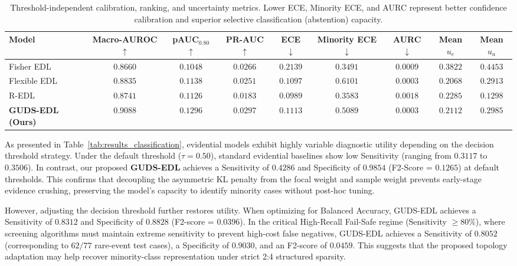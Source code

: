 \documentclass[letterpaper]{article} %
\begin{document}
\begin{table}[!t]
\centering
\caption{Threshold-independent calibration, ranking, and uncertainty metrics. Lower ECE, Minority ECE, and AURC represent better confidence calibration and superior selective classification (abstention) capacity.}
\label{tab:results_uncertainty}
\renewcommand{\arraystretch}{1.12}
\setlength{\tabcolsep}{3.0pt}
\begin{adjustbox}{max width=\textwidth}
\begin{tabular}{l C C C C C C C C}
\toprule
\textbf{Model} & \textbf{Macro-AUROC} $\uparrow$ & \textbf{pAUC$_{0.80}$} $\uparrow$ & \textbf{PR-AUC} $\uparrow$ & \textbf{ECE} $\downarrow$ & \textbf{Minority ECE} $\downarrow$ & \textbf{AURC} $\downarrow$ & \textbf{Mean $u_e$} & \textbf{Mean $u_a$} \\
\midrule
Fisher EDL   & $0.8660$ & $0.1048$ & $0.0266$ & $0.2139$ & $\mathbf{0.3491}$ & $0.0009$ & $0.3822$ & $0.4453$ \\
Flexible EDL & $0.8835$ & $0.1138$ & $0.0251$ & $0.1097$ & $0.6101$ & $\mathbf{0.0003}$ & $0.2068$ & $0.2913$ \\
R-EDL        & $0.8741$ & $0.1126$ & $0.0183$ & $\mathbf{0.0989}$ & $0.3583$ & $0.0018$ & $0.2285$ & $\mathbf{0.1298}$ \\
\midrule
\textbf{GUDS-EDL (Ours)} & $\mathbf{0.9088}$ & $\mathbf{0.1296}$ & $\mathbf{0.0297}$ & $0.1113$ & $0.5089$ & $\mathbf{0.0003}$ & $0.2112$ & $0.2985$ \\
\bottomrule
\end{tabular}
\end{adjustbox}
\end{table}

As presented in Table~\ref{tab:results_classification}, evidential models exhibit highly variable diagnostic utility depending on the decision threshold strategy. Under the default threshold ($\tau = 0.50$), standard evidential baselines show low Sensitivity (ranging from $0.3117$ to $0.3506$). In contrast, our proposed \textbf{GUDS-EDL} achieves a Sensitivity of $\mathbf{0.4286}$ and Specificity of $\mathbf{0.9854}$ (F2-Score = $\mathbf{0.1265}$) at default thresholds. This confirms that decoupling the asymmetric KL penalty from the focal weight and sample weight prevents early-stage evidence crushing, preserving the model's capacity to identify minority cases without post-hoc tuning.

However, adjusting the decision threshold further restores utility. When optimizing for Balanced Accuracy, GUDS-EDL achieves a Sensitivity of $\mathbf{0.8312}$ and Specificity of $\mathbf{0.8828}$ (F2-score = $\mathbf{0.0396}$). In the critical High-Recall Fail-Safe regime (Sensitivity $\ge 80\%$), where screening algorithms must maintain extreme sensitivity to prevent high-cost false negatives, GUDS-EDL achieves a Sensitivity of $0.8052$ (corresponding to $62/77$ rare-event test cases), a Specificity of $\mathbf{0.9030}$, and an F2-score of $\mathbf{0.0459}$. This suggests that the proposed topology adaptation may help recover minority-class representation under strict 2:4 structured sparsity.
\end{document}
